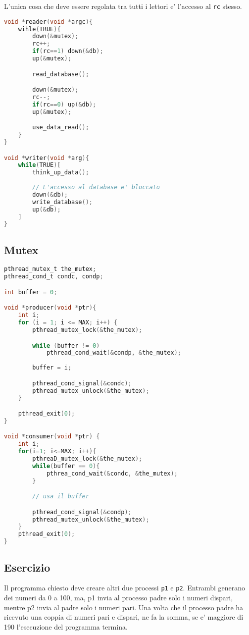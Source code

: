 L'unica cosa che deve essere regolata tra tutti i lettori e' l'accesso al \texttt{rc} stesso.

\begin{lstlisting}[language=c]
void *reader(void *argc){
    wihle(TRUE){
        down(&mutex);
        rc++;
        if(rc==1) down(&db);
        up(&mutex);

        read_database();

        down(&mutex);
        rc--;
        if(rc==0) up(&db);
        up(&mutex);

        use_data_read();
    }
}

void *writer(void *arg){
    while(TRUE)[
        think_up_data();
        
        // L'accesso al database e' bloccato
        down(&db);
        write_database();
        up(&db);
    ]
}
\end{lstlisting}

\subsection{Mutex}
\begin{lstlisting}[language=c]
pthread_mutex_t the_mutex;
pthread_cond_t condc, condp;

int buffer = 0;

void *producer(void *ptr){
    int i;
    for (i = 1; i <= MAX; i++) {
        pthread_mutex_lock(&the_mutex);

        while (buffer != 0)
            pthread_cond_wait(&condp, &the_mutex);
        
        buffer = i;

        pthread_cond_signal(&condc);
        pthread_mutex_unlock(&the_mutex);
    }

    pthread_exit(0);
}

void *consumer(void *ptr) {
    int i;
    for(i=1; i<=MAX; i++){
        pthreaD_mutex_lock(&the_mutex);
        while(buffer == 0){
            pthrea_cond_wait(&condc, &the_mutex);
        }

        // usa il buffer

        pthread_cond_signal(&condp);
        pthread_mutex_unlock(&the_mutex);
    }
    pthread_exit(0);
}
\end{lstlisting}

\subsection{Esercizio}
Il programma chiesto deve creare altri due processi \texttt{p1} e \texttt{p2}.
Entrambi generano dei numeri da 0 a 100, ma, p1 invia al processo padre solo
i numeri dispari, mentre p2 invia al padre solo i numeri pari.
Una volta che il processo padre ha ricevuto una coppia di numeri pari e dispari, ne fa la 
somma, se e' maggiore di 190 l'esecuzione del programma termina.

